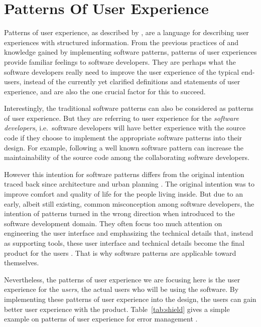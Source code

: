 \documentclass{acm_proc_article-sp}
\begin{document}
\section{Patterns Of User Experience}
\label{sec:pux}

Patterns of user experience, as described by \citet{pux:blackwell},
are a language for describing user experiences with structured
information. From the previous practices of and knowledge gained by
implementing software patterns, patterns of user experiences provide
familiar feelings to software developers. They are perhaps what the
software developers really need to improve the user experience of the
typical end-users, instead of the currently yet clarified definitions
and statements of user experience, and are also the one crucial factor
for this to succeed.

Interestingly, the traditional software patterns can also be
considered as patterns of user experience. But they are referring to
user experience for the \textit{software developers}, i.e.\ software
developers will have better experience with the source code if they
choose to implement the appropriate software patterns into their
design. For example, following a well known software pattern can
increase the maintainability of the source code among the
collaborating software developers.

However this intention for software patterns differs from the original
intention traced back since architecture and urban planning
\citep{timeless:alexander}. The original intention was to improve
comfort and quality of life for the people living inside. But due to
an early, albeit still existing, common misconception among software
developers, the intention of patterns turned in the wrong direction
when introduced to the software development domain. They often focus
too much attention on engineering the user interface and emphasizing
the technical details that, instead as supporting tools, these user
interface and technical details become the final product for the users
\citep{pux:blackwell}. That is why software patterns are applicable
toward themselves.

Nevertheless, the patterns of user experience we are focusing here is
the user experience for the \textit{users}, the actual users who will
be using the software. By implementing these patterns of user
experience into the design, the users can gain better user experience
with the product. Table~\ref{tab:shield} gives a simple example on
patterns of user experience for error management
\citep{patterns:welie}.
\end{document}

